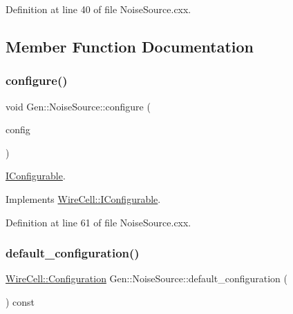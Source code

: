 Definition at line 40 of file Noise\+Source.\+cxx.



\subsection{Member Function Documentation}
\mbox{\label{class_wire_cell_1_1_gen_1_1_noise_source_a047efbb1be0463d0910dde2e259bf971}} 
\subsubsection{\texorpdfstring{configure()}{configure()}}
{\footnotesize\ttfamily void Gen\+::\+Noise\+Source\+::configure (\begin{DoxyParamCaption}\item[{const \hyperlink{namespace_wire_cell_a9f705541fc1d46c608b3d32c182333ee}{Wire\+Cell\+::\+Configuration} \&}]{config }\end{DoxyParamCaption})\hspace{0.3cm}{\ttfamily [virtual]}}



\hyperlink{class_wire_cell_1_1_i_configurable}{I\+Configurable}. 



Implements \hyperlink{class_wire_cell_1_1_i_configurable_a57ff687923a724093df3de59c6ff237d}{Wire\+Cell\+::\+I\+Configurable}.



Definition at line 61 of file Noise\+Source.\+cxx.

\mbox{\label{class_wire_cell_1_1_gen_1_1_noise_source_a866c0843c7030c5b26305439365b4de3}} 
\subsubsection{\texorpdfstring{default\+\_\+configuration()}{default\_configuration()}}
{\footnotesize\ttfamily \hyperlink{namespace_wire_cell_a9f705541fc1d46c608b3d32c182333ee}{Wire\+Cell\+::\+Configuration} Gen\+::\+Noise\+Source\+::default\+\_\+configuration (\begin{DoxyParamCaption}{ }\end{DoxyParamCaption}) const\hspace{0.3cm}{\ttfamily [virtual]}}



